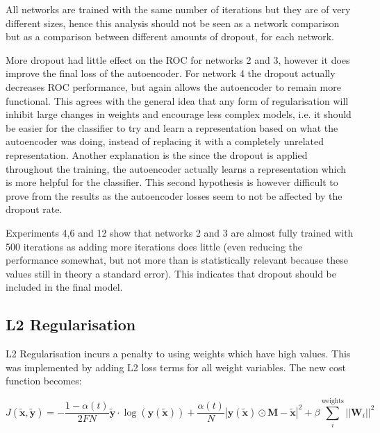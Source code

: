       All networks are trained with the same number of iterations but they are of very different sizes,
      hence this analysis should not be seen as a network comparison but as a comparison between different amounts of dropout, for each network.

      More dropout had little effect on the ROC for networks 2 and 3, however it does
      improve the final loss of the autoencoder. For network 4 the dropout actually decreases
      ROC performance, but again allows the autoencoder to remain more functional. This
      agrees with the general idea that any form of regularisation will inhibit large changes
      in weights and encourage less complex models, i.e. it should be easier for the classifier to try and learn
      a representation based on what the autoencoder was doing, instead of replacing it with a completely unrelated
      representation. Another explanation is the since the dropout is applied throughout the training, the autoencoder
      actually learns a representation which is more helpful for the classifier. This second hypothesis is
      however difficult to prove from the results as the autoencoder losses seem to not be affected by the dropout rate.

      Experiments 4,6 and 12 show that networks 2 and 3 are almost fully trained
      with 500 iterations as adding more iterations does little (even reducing the performance somewhat, but not more than is statistically relevant because
      these values still in theory a standard error). This indicates that dropout should be included in the final model.


      \newpage
    \subsection{L2 Regularisation}
      L2 Regularisation incurs a penalty to using weights which have high values. This was implemented by adding L2
      loss terms for all weight variables. The new cost function becomes:

      \begin{equation} \label{eq:l2_cost_model}
          J(\tilde{\mathbf{x}},\tilde{\mathbf{y}}) = -\frac{1-\alpha(t)}{2FN}\tilde{\mathbf{y}}\cdot\log(\mathbf{y}(\tilde{\mathbf{x}}))
          + \frac{\alpha(t)}{N}\left |\mathbf{y}(\tilde{\mathbf{x}}) \odot \mathbf{M}-\tilde{\mathbf{x}}\right | ^2
          + \beta \sum_i^{\text{weights}}||\mathbf{W}_i||^2
      \end{equation}

